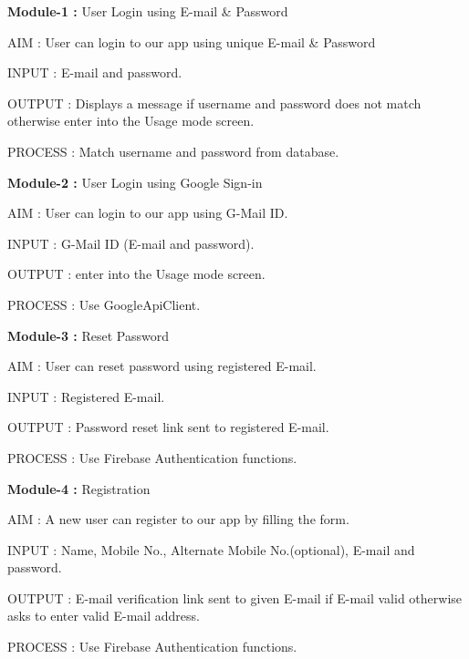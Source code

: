 \documentclass{report}
\begin{document}
\noindent \newline
\textbf{Module-1 :} User Login using E-mail \& Password
\begin{description}
\item AIM : User can login to our app using unique E-mail \& Password
\item INPUT : E-mail and password.    
\item OUTPUT :  Displays a message if username and password does not match otherwise enter into the Usage mode screen.
\item PROCESS : Match username and password from database.
\end{description}

\noindent \newline \textbf{Module-2 :} User Login using Google Sign-in
\begin{description}
\item AIM : User can login to our app using G-Mail ID.
\item INPUT : G-Mail ID (E-mail and password).
\item OUTPUT : enter into the Usage mode screen.
\item PROCESS : Use GoogleApiClient.
\end{description}

\noindent \newline \textbf{Module-3 :} Reset Password
\begin{description}
\item AIM : User can reset password using registered E-mail.
\item INPUT : Registered E-mail.
\item OUTPUT : Password reset link sent to registered E-mail.
\item PROCESS : Use Firebase Authentication functions.
\end{description}

\noindent \newline \textbf{Module-4 :} Registration
\begin{description}
\item AIM : A new user can register to our app by filling the form.
\item INPUT : Name, Mobile No., Alternate Mobile No.(optional), E-mail and password.
\item OUTPUT : E-mail verification link sent to given E-mail if E-mail valid otherwise asks to enter valid E-mail address.
\item PROCESS : Use Firebase Authentication functions.
\end{description}
\end{document}
